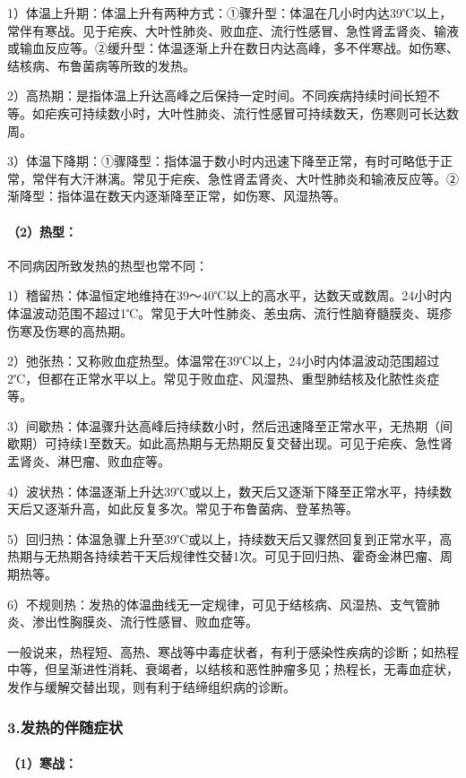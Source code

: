 1）体温上升期：体温上升有两种方式：①骤升型：体温在几小时内达39℃以上，常伴有寒战。见于疟疾、大叶性肺炎、败血症、流行性感冒、急性肾盂肾炎、输液或输血反应等。②缓升型：体温逐渐上升在数日内达高峰，多不伴寒战。如伤寒、结核病、布鲁菌病等所致的发热。

2）高热期：是指体温上升达高峰之后保持一定时间。不同疾病持续时间长短不等。如疟疾可持续数小时，大叶性肺炎、流行性感冒可持续数天，伤寒则可长达数周。

3）体温下降期：①骤降型：指体温于数小时内迅速下降至正常，有时可略低于正常，常伴有大汗淋漓。常见于疟疾、急性肾盂肾炎、大叶性肺炎和输液反应等。②渐降型：指体温在数天内逐渐降至正常，如伤寒、风湿热等。

\paragraph{（2）热型：}

不同病因所致发热的热型也常不同：

1）稽留热：体温恒定地维持在39～40℃以上的高水平，达数天或数周。24小时内体温波动范围不超过1℃。常见于大叶性肺炎、恙虫病、流行性脑脊髓膜炎、斑疹伤寒及伤寒的高热期。

2）弛张热：又称败血症热型。体温常在39℃以上，24小时内体温波动范围超过2℃，但都在正常水平以上。常见于败血症、风湿热、重型肺结核及化脓性炎症等。

3）间歇热：体温骤升达高峰后持续数小时，然后迅速降至正常水平，无热期（间歇期）可持续1至数天。如此高热期与无热期反复交替出现。可见于疟疾、急性肾盂肾炎、淋巴瘤、败血症等。

4）波状热：体温逐渐上升达39℃或以上，数天后又逐渐下降至正常水平，持续数天后又逐渐升高，如此反复多次。常见于布鲁菌病、登革热等。

5）回归热：体温急骤上升至39℃或以上，持续数天后又骤然回复到正常水平，高热期与无热期各持续若干天后规律性交替1次。可见于回归热、霍奇金淋巴瘤、周期热等。

6）不规则热：发热的体温曲线无一定规律，可见于结核病、风湿热、支气管肺炎、渗出性胸膜炎、流行性感冒、败血症等。

一般说来，热程短、高热、寒战等中毒症状者，有利于感染性疾病的诊断；如热程中等，但呈渐进性消耗、衰竭者，以结核和恶性肿瘤多见；热程长，无毒血症状，发作与缓解交替出现，则有利于结缔组织病的诊断。

\subsubsection{3.发热的伴随症状}

\paragraph{（1）寒战：}

